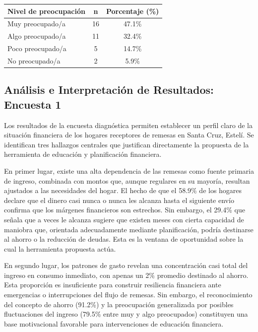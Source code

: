\documentclass[12pt,letterpaper]{article}
\begin{document}
\begin{longtable}[]{@{}lcc@{}}
\toprule\noalign{}
Nivel de preocupación & n & Porcentaje (\%) \\
\midrule\noalign{}
\endhead
\bottomrule\noalign{}
\endlastfoot
Muy preocupado/a & 16 & 47.1\% \\
Algo preocupado/a & 11 & 32.4\% \\
Poco preocupado/a & 5 & 14.7\% \\
No preocupado/a & 2 & 5.9\% \\
\end{longtable}

\subsection{\texorpdfstring{\textbf{Análisis e Interpretación de Resultados: Encuesta 1}}{Análisis e Interpretación de Resultados: Encuesta 1}}\label{anuxe1lisis-e-interpretaciuxf3n-de-resultados-encuesta-1}

Los resultados de la encuesta diagnóstica permiten establecer un perfil claro de la situación financiera de los hogares receptores de remesas en Santa Cruz, Estelí. Se identifican tres hallazgos centrales que justifican directamente la propuesta de la herramienta de educación y planificación financiera.

En primer lugar, existe una alta dependencia de las remesas como fuente primaria de ingreso, combinada con montos que, aunque regulares en su mayoría, resultan ajustados a las necesidades del hogar. El hecho de que el 58.9\% de los hogares declare que el dinero casi nunca o nunca les alcanza hasta el siguiente envío confirma que los márgenes financieros son estrechos. Sin embargo, el 29.4\% que señala que a veces le alcanza sugiere que existen meses con cierta capacidad de maniobra que, orientada adecuadamente mediante planificación, podría destinarse al ahorro o la reducción de deudas. Esta es la ventana de oportunidad sobre la cual la herramienta propuesta actúa.

En segundo lugar, los patrones de gasto revelan una concentración casi total del ingreso en consumo inmediato, con apenas un 2\% promedio destinado al ahorro. Esta proporción es insuficiente para construir resiliencia financiera ante emergencias o interrupciones del flujo de remesas. Sin embargo, el reconocimiento del concepto de ahorro (91.2\%) y la preocupación generalizada por posibles fluctuaciones del ingreso (79.5\% entre muy y algo preocupados) constituyen una base motivacional favorable para intervenciones de educación financiera.
\end{document}
